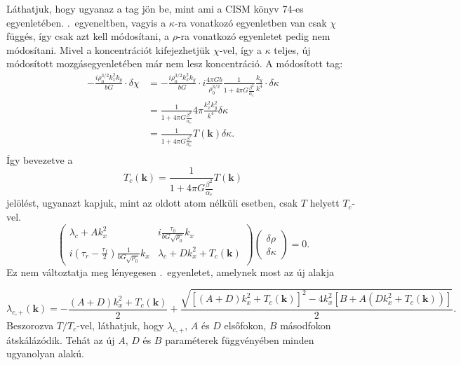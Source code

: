 \documentclass[10pt,a4paper]{scrartcl}
\let\mathbf\bm
\begin{document}
Láthatjuk, hogy ugyanaz a tag jön be, mint ami a CISM könyv 74-es egyenletében. .\ egyeneltben, vagyis a $\kappa$-ra vonatkozó egyenletben van csak $\chi$ függés, így csak azt kell módosítani, a $\rho$-ra vonatkozó egyenletet pedig nem módosítani. Mivel a koncentrációt kifejezhetjük $\chi$-vel, így a $\kappa$ teljes, új módosított mozgásegyenletében már nem lesz koncentráció. A módosított tag:
\[\begin{aligned}
   - \frac{{i\rho _0^{3/2}k_x^2{k_y}}}{{bG}} \cdot \delta \chi  &  =  - \frac{{i\rho _0^{3/2}k_x^2{k_y}}}{{bG}} \cdot i\frac{{4\pi Gb}}{{\rho _0^{3/2}}}\frac{1}{{1 + 4\pi G\frac{{{\beta ^2}}}{{{\alpha _c}}}}}\frac{{{k_y}}}{{{k^4}}} \cdot \delta \kappa  \\ 
   &  = \frac{1}{{1 + 4\pi G\frac{{{\beta ^2}}}{{{\alpha _c}}}}}4\pi \frac{{k_x^2k_y^2}}{{{k^4}}}\delta \kappa  \\ 
   &  = \frac{1}{{1 + 4\pi G\frac{{{\beta ^2}}}{{{\alpha _c}}}}}T\left( {\mathbf{k}} \right)\delta \kappa.  \\ 
\end{aligned} \]
Így bevezetve a
\[{{T_c}\left( {\mathbf{k}} \right)} = \frac{1}{{1 + 4\pi G\frac{{{\beta ^2}}}{{{\alpha _c}}}}}T\left( {\mathbf{k}} \right)\]
jelölést, ugyanazt kapjuk, mint az oldott atom nélküli esetben, csak $T$ helyett $T_c$-vel.
\begin{equation*}
\left({\begin{array}{*{20}{c}}
  {\lambda_c  + Ak_x^2}&{i\frac{{{\tau _0}}}{{bG\sqrt {{\rho _0}} }}{k_x}} \\ 
  {i\left( {{\tau _r} - \frac{{{\tau _f}}}{2}} \right)\frac{1}{{bG\sqrt {{\rho _0}} }}{k_x}}&{\lambda_c  + Dk_x^2 + {T_c}\left( {\mathbf{k}} \right)}
\end{array}} \right)\left( {\begin{array}{*{20}{c}}
  {\delta \rho } \\ 
  {\delta \kappa }
\end{array}} \right) = 0.
\end{equation*}
Ez nem változtatja meg lényegesen .\ egyenletet, amelynek most az új alakja

\begin{equation} \label{eq:lambda_c_k}
{\lambda _{c, + }}\left( {\mathbf{k}} \right) =  - \frac{{\left( {A + D} \right)k_x^2 + {T_c}\left( {\mathbf{k}} \right)}}{2} + \frac{{\sqrt {{{\left[ {\left( {A + D} \right)k_x^2 + {T_c}\left( {\mathbf{k}} \right)} \right]}^2} - 4k_x^2\left[ {B  + A\left( {Dk_x^2 + {T_c}\left( {\mathbf{k}} \right)} \right)} \right]} }}{2}.
\end{equation}
Beszorozva $T/T_c$-vel, láthatjuk, hogy $\lambda_{c,+}$, $A$ és $D$ elsőfokon, $B$ másodfokon átskálázódik. Tehát az új $A$, $D$ és $B$ paraméterek függvényében minden ugyanolyan alakú.
\end{document}

